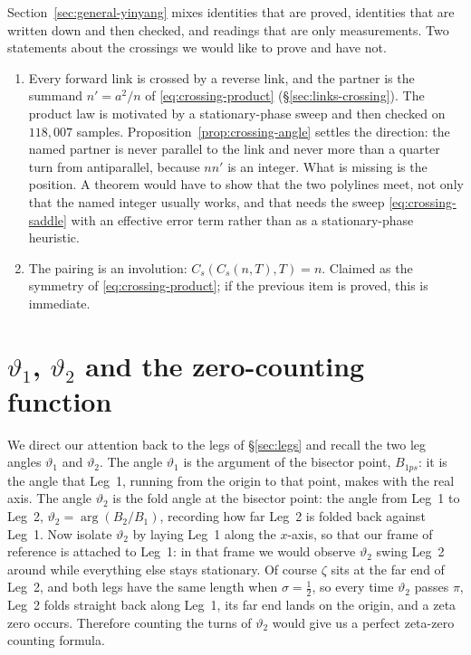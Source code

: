 \documentclass[11pt]{article}
\theoremstyle{definition}
\begin{document}
Section~\ref{sec:general-yinyang} mixes identities that are proved,
identities that are written down and then checked, and readings that are
only measurements. Two
statements about the crossings we would like to prove and have not.

\begin{enumerate}
\item
Every forward link is crossed by a reverse link, and the partner is the
summand $n'=a^{2}/n$ of \eqref{eq:crossing-product}
(\S\ref{sec:links-crossing}).
The product law is motivated by a stationary-phase sweep and then
checked on $118{,}007$ samples.
Proposition~\ref{prop:crossing-angle} settles the direction: the named
partner is never parallel to the link and never more than a quarter turn
from antiparallel, because $nn'$ is an integer. What is missing is the
position. A theorem would have to show that the
two polylines meet, not only that the named integer usually works, and
that needs the sweep \eqref{eq:crossing-saddle} with an effective error
term rather than as a stationary-phase heuristic.

\item
The pairing is an involution: $C_{s}(C_{s}(n,T),T)=n$.
Claimed as the symmetry of \eqref{eq:crossing-product}; if the previous
item is proved, this is immediate.
\end{enumerate}

\section{\texorpdfstring{$\vartheta_1$, $\vartheta_2$}{theta1, theta2} and
the zero-counting function}\label{sec:counting}

We direct our attention back to the legs of \S\ref{sec:legs} and recall the
two leg angles $\vartheta_1$ and $\vartheta_2$. The angle $\vartheta_1$ is
the argument of the bisector point, $B_{1ps}$: it is the angle that Leg~1,
running from the origin to that point,
makes with the real axis. The angle $\vartheta_2$ is the fold angle at the
bisector point: the angle from Leg~1 to Leg~2,
$\vartheta_2=\arg(B_2/B_1)$, recording how far Leg~2 is folded back against
Leg~1. Now isolate $\vartheta_2$ by laying Leg~1 along the $x$-axis, so that
our frame of reference is attached to Leg~1: in that frame we would observe
$\vartheta_2$ swing Leg~2 around while everything else stays stationary. Of
course $\zeta$ sits at the far end of Leg~2, and both legs have the same
length when $\sigma=\tfrac12$, so every time $\vartheta_2$ passes $\pi$,
Leg~2 folds straight back along Leg~1, its far end lands on the origin, and
a zeta zero occurs. Therefore counting the turns of $\vartheta_2$ would give
us a perfect zeta-zero counting formula.
\end{document}
